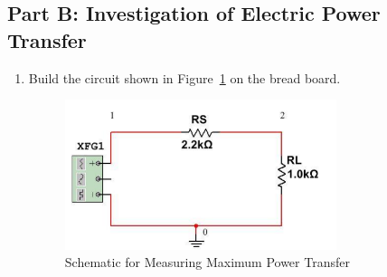 \documentclass{article}
\begin{document}
\subsection{Part B: Investigation of Electric Power Transfer}
\label{sub:Procedure Part B}
\begin{enumerate}
  \item Build the circuit shown in Figure~\ref{fig:maxpowerschem}  on the bread board.
    \begin{figure}[!ht]
  \centering
  \caption{Schematic for Measuring Maximum Power Transfer\label{fig:maxpowerschem}}
  \includegraphics[width=0.75\textwidth]{img/c2.png}
  \end{figure}


\end{enumerate}
\end{document}
